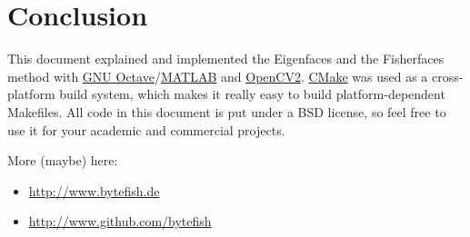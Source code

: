 \section{Conclusion}
This document explained and implemented the Eigenfaces \cite{PT91} and the Fisherfaces \cite{belhumeru97} method with \href{http://www.gnu.org/software/octave}{GNU Octave}/\href{http://mathworks.com}{MATLAB} and \href{http://opencv.willowgarage.com}{OpenCV2}. \href{http://www.cmake.org}{CMake} was used as a cross-platform build system, which makes it really easy to build platform-dependent Makefiles. All code in this document is put under a BSD license, so feel free to use it for your academic and commercial projects. 

More (maybe) here: 
\begin{itemize}
	\item \url{http://www.bytefish.de}
	\item \url{http://www.github.com/bytefish}
\end{itemize}

